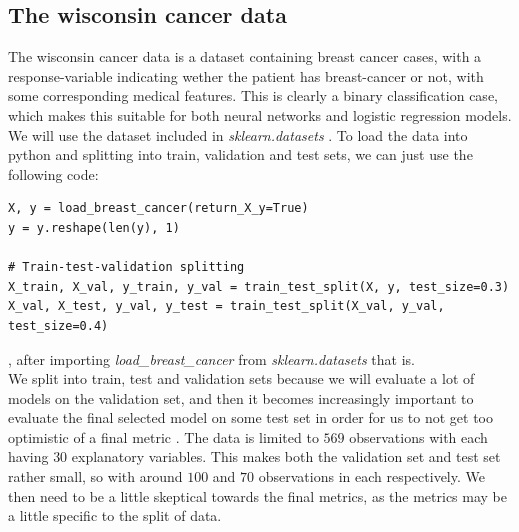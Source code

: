 \documentclass{article}
\begin{document}
\subsection{The wisconsin cancer data}
The wisconsin cancer data \cite{breastcancerwisconsin} is a dataset containing
breast cancer cases, with a response-variable indicating wether the patient has
breast-cancer or not, with some corresponding medical features. This is clearly
a binary classification case, which makes this suitable for both neural networks
and logistic regression models. We will use the dataset included in
\textit{sklearn.datasets} \cite{sklearncancerdata}. To load the data into python
and splitting into train, validation and test sets, we can just use the
following code:

\begin{lstlisting}
X, y = load_breast_cancer(return_X_y=True)
y = y.reshape(len(y), 1)

# Train-test-validation splitting
X_train, X_val, y_train, y_val = train_test_split(X, y, test_size=0.3)
X_val, X_test, y_val, y_test = train_test_split(X_val, y_val, test_size=0.4)
\end{lstlisting}

, after importing \textit{load\_breast\_cancer} from \textit{sklearn.datasets}
\cite{sklearncancerdata} that is.
\\

We split into train, test and validation sets because we will evaluate a lot of
models on the validation set, and then it becomes increasingly important to
evaluate the final selected model on some test set in order for us to not get
too optimistic of a final metric \cite[s.~7.2]{hastie2009elements}.  The data is
limited to $569$ observations with each having $30$ explanatory variables. This
makes both the validation set and test set rather small, so with around $100$
and $70$ observations in each respectively. We then need to be a little
skeptical towards the final metrics, as the metrics may be a little specific to
the split of data.
\end{document}
